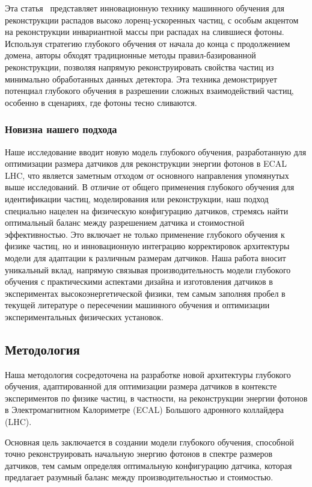 \documentclass[a4paper,12pt]{extarticle}
\begin{document}
Эта статья~\cite{PhysRevD.108.052002} представляет инновационную технику машинного обучения для реконструкции распадов высоко лоренц-ускоренных частиц, с особым акцентом на реконструкции инвариантной массы при распадах на слившиеся фотоны. Используя стратегию глубокого обучения от начала до конца с продолжением домена, авторы обходят традиционные методы правил-базированной реконструкции, позволяя напрямую реконструировать свойства частиц из минимально обработанных данных детектора. Эта техника демонстрирует потенциал глубокого обучения в разрешении сложных взаимодействий частиц, особенно в сценариях, где фотоны тесно сливаются.

\subsubsection*{Новизна нашего подхода}

Наше исследование вводит новую модель глубокого обучения, разработанную для оптимизации размера датчиков для реконструкции энергии фотонов в ECAL LHC, что является заметным отходом от основного направления упомянутых выше исследований. В отличие от общего применения глубокого обучения для идентификации частиц, моделирования или реконструкции, наш подход специально нацелен на физическую конфигурацию датчиков, стремясь найти оптимальный баланс между разрешением датчика и стоимостной эффективностью. Это включает не только применение глубокого обучения к физике частиц, но и инновационную интеграцию корректировок архитектуры модели для адаптации к различным размерам датчиков. Наша работа вносит уникальный вклад, напрямую связывая производительность модели глубокого обучения с практическими аспектами дизайна и изготовления датчиков в экспериментах высокоэнергетической физики, тем самым заполняя пробел в текущей литературе о пересечении машинного обучения и оптимизации экспериментальных физических установок.

\subsection{Методология}
\label{main_body:methodology}

Наша методология сосредоточена на разработке новой архитектуры глубокого обучения, адаптированной для оптимизации размера датчиков в контексте экспериментов по физике частиц, в частности, на реконструкции энергии фотонов в Электромагнитном Калориметре (ECAL) Большого адронного коллайдера (LHC).

Основная цель заключается в создании модели глубокого обучения, способной точно реконструировать начальную энергию фотонов в спектре размеров датчиков, тем самым определяя оптимальную конфигурацию датчика, которая предлагает разумный баланс между производительностью и стоимостью.
\end{document}
